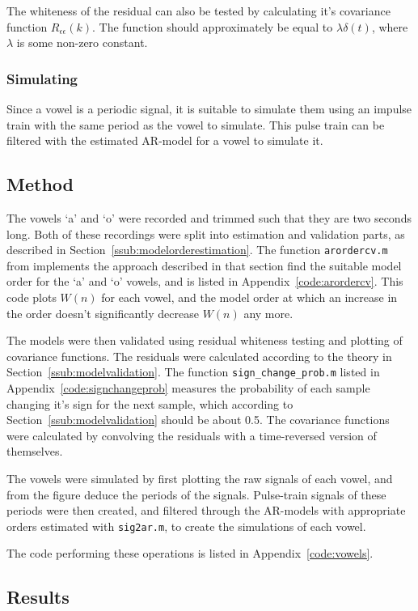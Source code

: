 \documentclass{IEEEtran}
\newcommand{\code}[1]{\texttt{#1}}
\begin{document}
The whiteness of the residual can also be tested by calculating it's covariance
function $R_{\epsilon\epsilon}(k)$. The function should approximately be equal
to $\lambda\delta(t)$, where $\lambda$ is some non-zero constant.

\subsubsection{Simulating}
Since a vowel is a periodic signal, it is suitable to simulate them using an
impulse train with the same period as the vowel to simulate. This pulse train
can be filtered with the estimated AR-model for a vowel to simulate it.

\subsection{Method}
The vowels `a' and `o' were recorded and trimmed such that they are two seconds
long. Both of these recordings were split into estimation and validation parts,
as described in Section~\ref{ssub:modelorderestimation}. The function 
\code{arordercv.m} from \cite{signalproc} implements the approach described in 
that section find the suitable model order for the `a' and `o' vowels, and is
listed in Appendix~\ref{code:arordercv}. This code plots $W(n)$ for each
vowel, and the model order at which an increase in the order doesn't
significantly decrease $W(n)$ any more.

The models were then validated using residual whiteness testing and plotting of
covariance functions. The residuals were calculated according to the theory in
Section~\ref{ssub:modelvalidation}. The function \code{sign\_change\_prob.m}
listed in Appendix~\ref{code:signchangeprob}
measures the probability of each sample changing it's sign for the next
sample, which according to Section~\ref{ssub:modelvalidation} should be about
0.5. The covariance functions were calculated by convolving the residuals with
a time-reversed version of themselves.

The vowels were simulated by first plotting the raw signals of each vowel, and
from the figure deduce the periods of the signals. Pulse-train signals of these
periods were then created, and filtered through the AR-models with appropriate
orders estimated with \code{sig2ar.m}, to create the simulations of each vowel.

The code performing these operations is listed in Appendix~\ref{code:vowels}.

\subsection{Results}
\end{document}
